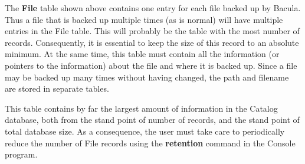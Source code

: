 {{{The {\bf File} table shown above contains one entry for each file backed up by
Bacula. Thus a file that is backed up multiple times (as is normal) will have
multiple entries in the File table. This will probably be the table with the
most number of records. Consequently, it is essential to keep the size of this
record to an absolute minimum. At the same time, this table must contain all
the information (or pointers to the information) about the file and where it
is backed up. Since a file may be backed up many times without having changed,
the path and filename are stored in separate tables.

This table contains by far the largest amount of information in the Catalog
database, both from the stand point of number of records, and the stand point
of total database size. As a consequence, the user must take care to
periodically reduce the number of File records using the {\bf retention}
command in the Console program.

\

}}}
